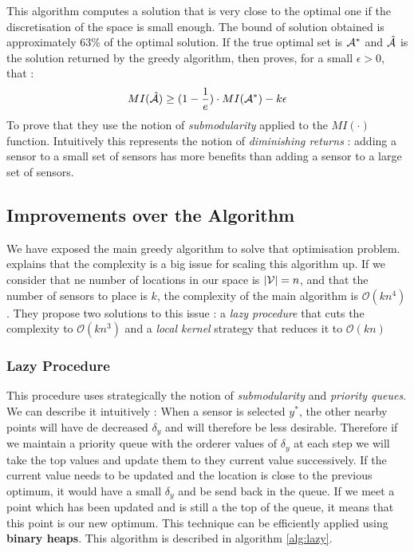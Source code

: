 \documentclass[12pt,twoside]{report}
\begin{document}
This algorithm computes a solution that is very close to the optimal one if the discretisation of the space is small enough. The bound of solution obtained is approximately 63\% of the optimal solution. If the true optimal set is $\mathcal{A}^*$ and $\hat{\mathcal{A}}$ is the solution returned by the greedy algorithm, then \citet{krause_near-optimal_2008} proves, for a small $\epsilon >0 $, that : 
 \begin{equation}
	MI(\hat{\mathcal{A}}) \geq (1 - \frac{1}{e}) \cdot MI(\mathcal{A}^*) - k\epsilon
\end{equation}
To prove that they use the notion of \textit{submodularity} \citep{nemhauser_analysis_1978} applied to the $MI(\cdot)$ function. Intuitively this represents the notion of \textit{diminishing returns} :  adding a sensor to a small set of sensors has more benefits than adding a sensor to a large set of sensors. 


\subsection{Improvements over the Algorithm}



We have exposed the main greedy algorithm to solve that optimisation problem. \citet{krause_near-optimal_2008} explains that the complexity is a big issue for scaling this algorithm up. If we consider that ne number of locations in our space is $|\mathcal{V}| = n$, and that the number of sensors to place is $k$, the complexity of the main algorithm is $\mathcal{O}(kn^4)$. They propose two solutions to this issue : a \textit{lazy procedure} that cuts the complexity to  $\mathcal{O}(kn^3)$ and a \textit{local kernel} strategy that reduces it to $\mathcal{O}(kn)$

\subsubsection{Lazy Procedure} This procedure uses strategically the notion of \textit{submodularity} and \textit{priority queues}. We can describe it intuitively : When a sensor is selected $y^*$, the other nearby points will have de decreased $\delta_y$ and will therefore be less desirable. Therefore if we maintain a priority queue with the orderer values of $\delta_y$ at each step we will take the top values and update them to they current value successively. If the current value needs to be updated and the location is close to the previous optimum, it would have a small $\delta_y$ and be send back in the queue. If we meet a point which has been updated and is still a the top of the queue, it means that this point is our new optimum. This technique can be efficiently applied using \textbf{binary heaps}. This algorithm is described in algorithm \ref{alg:lazy}. \\ 
\end{document}
